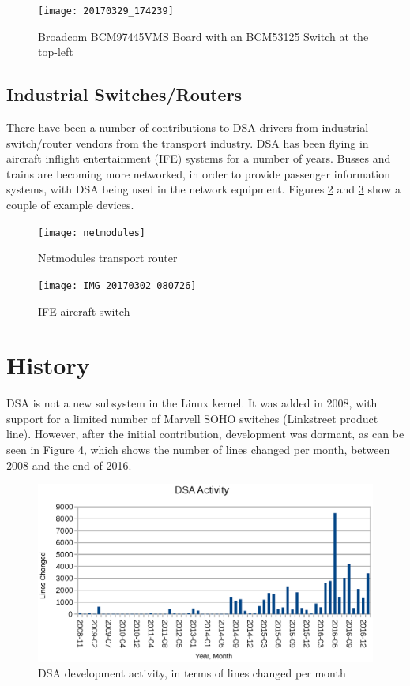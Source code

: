 \documentclass[letterpaper]{article}
\begin{document}
\begin{figure}[ht]
  \centering
  \texttt{[image: 20170329\_174239]}
  \caption{Broadcom BCM97445VMS Board with an BCM53125 Switch at the top-left}
  \label{BCM97445VMS}
\end{figure}

\subsection{Industrial Switches/Routers}

There have been a number of contributions to DSA drivers from
industrial switch/router vendors from the transport industry. DSA has
been flying in aircraft inflight entertainment (IFE) systems for a
number of years. Busses and trains are becoming more networked, in
order to provide passenger information systems, with DSA being used in
the network equipment. Figures \ref{netmodules} and \ref{ife} show a
couple of example devices.

\begin{figure}[ht]
  \centering
  \texttt{[image: netmodules]}
  \caption{Netmodules transport router}
  \label{netmodules}
\end{figure}

\begin{figure}[ht]
  \centering
  \texttt{[image: IMG\_20170302\_080726]}
  \caption{IFE aircraft switch}
  \label{ife}
\end{figure}

\section{History}

DSA is not a new subsystem in the Linux kernel. It was added in 2008,
with support for a limited number of Marvell SOHO switches (Linkstreet
product line). However, after the initial contribution, development
was dormant, as can be seen in Figure \ref{dsa-activity}, which shows
the number of lines changed per month, between 2008 and the end of
2016.

\begin{figure}[ht]
  \centering
  \includegraphics[width=\columnwidth]{dsa-activity}
  \caption{DSA development activity, in terms of lines changed per
    month}
  \label{dsa-activity}
\end{figure}
\end{document}
